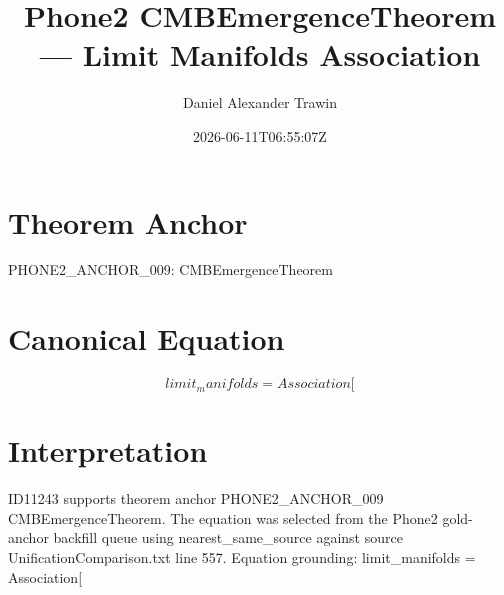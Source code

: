 \documentclass[11pt]{article}
\title{Phone2 CMBEmergenceTheorem — Limit Manifolds Association}
\author{Daniel Alexander Trawin}
\date{2026-06-11T06:55:07Z}
\begin{document}
\maketitle
\section*{Theorem Anchor}
PHONE2_ANCHOR_009: CMBEmergenceTheorem
\section*{Canonical Equation}
\[
limit_manifolds = Association[
\]
\section*{Interpretation}
ID11243 supports theorem anchor PHONE2_ANCHOR_009 CMBEmergenceTheorem. The equation was selected from the Phone2 gold-anchor backfill queue using nearest_same_source against source UnificationComparison.txt line 557. Equation grounding: limit_manifolds = Association[
\end{document}
